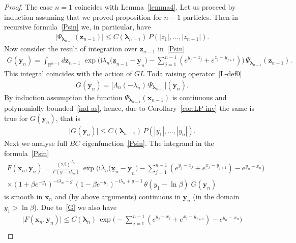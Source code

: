 \documentclass[10pt,a4paper]{amsart}
\renewcommand{\imath}{\mathrm{i}}
\begin{document}
\begin{proof}
	The case $n = 1$ coincides with Lemma~\ref{lemma4}. Let us proceed by induction assuming that we proved proposition for $n - 1$ particles. Then in recursive formula~\eqref{Psin} we, in particular, have
	\begin{align} \label{ind-as}
		\bigl| \Psi_{\bm{\lambda}_{n - 1}}(\bm{z}_{n - 1}) \bigr| \leq C(\bm{\lambda}_{n - 1}) \, P(|z_1|, \dots, |z_{n - 1}|).
	\end{align}
	Now consider the result of integration over $\bm{z}_{n - 1}$ in~\eqref{Psin} 
	\begin{align}
		G(\bm{y}_n) = \int_{\mathbb{R}^{n - 1}} d\bm{z}_{n - 1} \; \exp \Biggl( \imath \lambda_n \bigl( \underline{\bm{z}}_{n - 1} - \underline{\bm{y}}_n \bigr) - \sum_{j = 1}^{n - 1} (e^{y_j - z_j} + e^{z_j - y_{j + 1}} ) \Biggr) \, \Psi_{\bm{\lambda}_{n - 1}}(\bm{z}_{n - 1}).
	\end{align}
	This integral coincides with the action of $GL$ Toda raising operator~\eqref{L-def0}
	\begin{align}
		G(\bm{y}_n) = \bigl[ \Lambda_n(-\lambda_n) \, \Psi_{\bm{\lambda}_{n - 1}} \bigr] (\bm{y}_n).
	\end{align}
	By induction assumption the function $\Psi_{\bm{\lambda}_{n - 1}} (\bm{x}_{n - 1})$ is continuous and polynomially bounded~\eqref{ind-as}, hence, due to Corollary~\ref{cor:LP-inv} the same is true for $G(\bm{y}_n)$, that is
	\begin{align} \label{G}
		\bigl| G(\bm{y}_{n }) \bigr| \leq C(\bm{\lambda}_{n - 1}) \, P(|y_1|, \dots, |y_{n}|).
	\end{align}
	Next we analyse full $BC$ eigenfunction~\eqref{Psin}. The integrand in the formula~\eqref{Psin} 
	\begin{multline} \label{F2}
		F(\bm{x}_n, \bm{y}_n) = \frac{(2\beta)^{\imath \lambda_n}}{\Gamma(g - \imath \lambda_n)} \,\exp \Biggl( \imath \lambda_n \bigl( \underline{\bm{x}}_n - \underline{\bm{y}}_n \bigr)	- \sum_{j = 1}^{n - 1} ( e^{y_j - x_j} + e^{x_j - y_{j + 1}} ) - e^{y_n - x_n} \Biggr) \\[6pt]
		\times (1 + \beta e^{-y_1})^{- \imath \lambda_n - g} \, (1 - \beta e^{-y_1})^{- \imath \lambda_n + g - 1} \, \theta(y_1 - \ln \beta) \; G(\bm{y}_{n})
	\end{multline}
	is smooth in $\bm{x}_n$ and (by above arguments) continuous in $\bm{y}_n$ (in the domain $y_1 > \ln \beta$). Due to~\eqref{G} we also have
	\begin{multline}\label{F2-b}
		\bigl| F(\bm{x}_n, \bm{y}_n) \bigr| \leq C(\bm{\lambda}_n) \, \exp \Biggl( - \sum_{j = 1}^{n - 1} ( e^{y_j - x_j} + e^{x_j - y_{j + 1}} ) - e^{y_n - x_n} \Biggr) \\[6pt]

\end{multline}
\end{proof}
\end{document}
